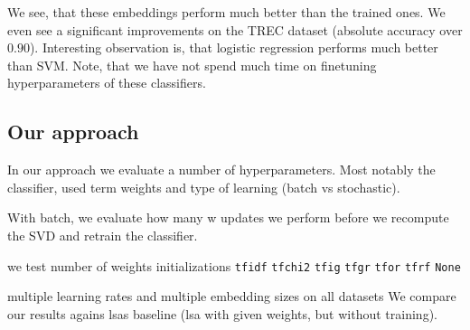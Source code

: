     
    We see, that these embeddings perform much better than the trained ones. 
    We even see a significant improvements on the TREC dataset (absolute accuracy over $0.90$).
    Interesting observation is, that logistic regression performs much better than SVM.
    Note, that we have not spend much time on finetuning hyperparameters of these classifiers. 

    
    \subsection{Our approach}
    
    In our approach we evaluate a number of hyperparameters. Most notably the classifier, used term weights and type of learning (batch vs stochastic).
    
    With batch, we evaluate how many w updates we perform before we recompute the SVD and retrain the classifier.
    
    \* %
    we test number of weights
    initializations
    \texttt{tfidf} \texttt{tfchi2} \texttt{tfig} \texttt{tfgr} \texttt{tfor} \texttt{tfrf} \texttt{None}

    multiple learning rates and multiple embedding sizes on all datasets
    We compare our results agains lsas baseline (lsa with given weights, but without training).
    